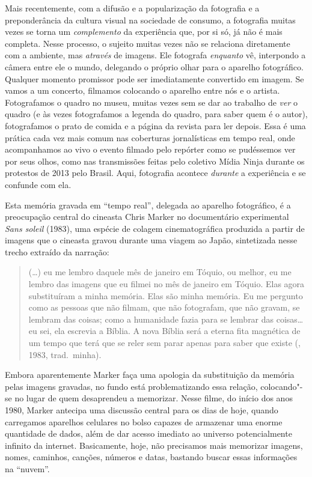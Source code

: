 Mais recentemente, com a difusão e a popularização da fotografia e a
preponderância da cultura visual na sociedade de consumo, a fotografia
muitas vezes se torna um \emph{complemento} da experiência que, por si
só, já não é mais completa. Nesse processo, o sujeito muitas vezes não
se relaciona diretamente com a ambiente, mas \emph{através} de imagens.
Ele fotografa \emph{enquanto} vê, interpondo a câmera entre ele o mundo,
delegando o próprio olhar para o aparelho fotográfico. Qualquer momento
promissor pode ser imediatamente convertido em imagem. Se vamos a um
concerto, filmamos colocando o aparelho entre nós e o artista.
Fotografamos o quadro no museu, muitas vezes sem se dar ao trabalho de
\emph{ver} o quadro (e às vezes fotografamos a legenda do quadro, para
saber quem é o autor), fotografamos o prato de comida e a página da
revista para ler depois. Essa é uma prática cada vez mais comum nas
coberturas jornalísticas em tempo real, onde acompanhamos ao vivo o
evento filmado pelo repórter como se pudéssemos ver por seus olhos, como
nas transmissões feitas pelo coletivo Mídia Ninja durante os protestos
de 2013 pelo Brasil. Aqui, fotografia acontece \emph{durante} a
experiência e se confunde com ela.

Esta memória gravada em ``tempo real'', delegada ao aparelho fotográfico,
é a preocupação central do cineasta Chris Marker no documentário
experimental \emph{Sans soleil} (1983), uma espécie de colagem
cinematográfica produzida a partir de imagens que o cineasta gravou
durante uma viagem ao Japão, sintetizada nesse trecho extraído da
narração:

\begin{quote}
(\ldots{}) eu me lembro daquele mês de janeiro em Tóquio, ou melhor, eu me
lembro das imagens que eu filmei no mês de janeiro em Tóquio. Elas agora
substituíram a minha memória. Elas são minha memória. Eu me pergunto
como as pessoas que não filmam, que não fotografam, que não gravam, se
lembram das coisas; como a humanidade fazia para se lembrar das
coisas\ldots{} eu sei, ela escrevia a Bíblia. A nova Bíblia será a eterna fita
magnética de um tempo que terá que se reler sem parar apenas para saber
que existe (, 1983, trad.~minha).
\end{quote}

Embora aparentemente Marker faça uma apologia da substituição da memória
pelas imagens gravadas, no fundo está problematizando essa relação,
colocando"-se no lugar de quem desaprendeu a memorizar. Nesse filme, do
início dos anos 1980, Marker antecipa uma discussão central para os dias
de hoje, quando carregamos aparelhos celulares no bolso capazes de
armazenar uma enorme quantidade de dados, além de dar acesso imediato ao
universo potencialmente infinito da internet. Basicamente, hoje, não
precisamos mais memorizar imagens, nomes, caminhos, canções, números e
datas, bastando buscar essas informações na ``nuvem''.

